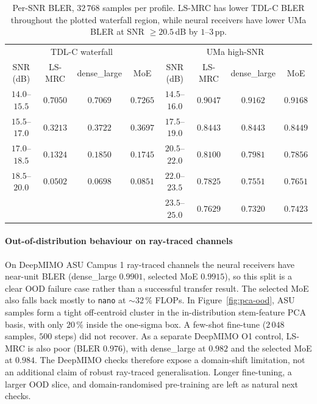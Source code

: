 \begin{table}[h]
\centering
\small
\setlength{\tabcolsep}{5pt}
\begin{tabular}{c c c c | c c c c}
\toprule
\multicolumn{4}{c|}{TDL-C waterfall} & \multicolumn{4}{c}{UMa high-SNR} \\
SNR (dB) & LS-MRC & dense\_large & MoE & SNR (dB) & LS-MRC & dense\_large & MoE \\
\midrule
$14.0$--$15.5$ & $\mathbf{0.7050}$ & $0.7069$ & $0.7265$ & $14.5$--$16.0$ & $\mathbf{0.9047}$ & $0.9162$ & $0.9168$ \\
$15.5$--$17.0$ & $\mathbf{0.3213}$ & $0.3722$ & $0.3697$ & $17.5$--$19.0$ & $\mathbf{0.8443}$ & $\mathbf{0.8443}$ & $0.8449$ \\
$17.0$--$18.5$ & $\mathbf{0.1324}$ & $0.1850$ & $0.1745$ & $20.5$--$22.0$ & $0.8100$ & $0.7981$ & $\mathbf{0.7856}$ \\
$18.5$--$20.0$ & $\mathbf{0.0502}$ & $0.0698$ & $0.0851$ & $22.0$--$23.5$ & $0.7825$ & $\mathbf{0.7551}$ & $0.7651$ \\
                &                  &          &          & $23.5$--$25.0$ & $0.7629$ & $\mathbf{0.7320}$ & $0.7423$ \\
\bottomrule
\end{tabular}
\caption{Per-SNR BLER, $32\,768$ samples per profile. LS-MRC has lower TDL-C BLER throughout the plotted waterfall region, while neural receivers have lower UMa BLER at SNR $\geq 20.5$\,dB by $1$--$3$\,pp.}
\label{tab:lmmse-snr}
\end{table}

\paragraph{Out-of-distribution behaviour on ray-traced channels}
On DeepMIMO ASU Campus 1 ray-traced channels the neural receivers have near-unit BLER (dense\_large $0.9901$, selected MoE $0.9915$), so this split is a clear OOD failure case rather than a successful transfer result. The selected MoE also falls back mostly to \texttt{nano} at $\sim 32\,\%$ FLOPs. In Figure~\ref{fig:pca-ood}, ASU samples form a tight off-centroid cluster in the in-distribution stem-feature PCA basis, with only $20\,\%$ inside the one-sigma box. A few-shot fine-tune ($2\,048$ samples, $500$ steps) did not recover. As a separate DeepMIMO O1 control, LS-MRC is also poor (BLER $0.976$), with dense\_large at $0.982$ and the selected MoE at $0.984$. The DeepMIMO checks therefore expose a domain-shift limitation, not an additional claim of robust ray-traced generalisation. Longer fine-tuning, a larger OOD slice, and domain-randomised pre-training are left as natural next checks.

